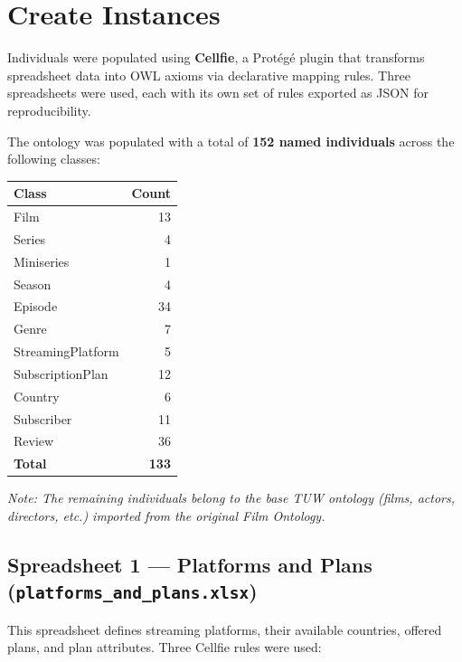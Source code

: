 \chapter{Create Instances}

Individuals were populated using \textbf{Cellfie}, a Protégé plugin that transforms spreadsheet data into OWL axioms via declarative mapping rules. Three spreadsheets were used, each with its own set of rules exported as JSON for reproducibility.

\vspace{0.3cm}
\noindent The ontology was populated with a total of \textbf{152 named individuals} across the following classes:

\begin{center}
\begin{tabular}{lr}
\hline
\textbf{Class} & \textbf{Count} \\
\hline
Film & 13 \\
Series & 4 \\
Miniseries & 1 \\
Season & 4 \\
Episode & 34 \\
Genre & 7 \\
StreamingPlatform & 5 \\
SubscriptionPlan & 12 \\
Country & 6 \\
Subscriber & 11 \\
Review & 36 \\
\hline
\textbf{Total} & \textbf{133} \\
\hline
\end{tabular}
\end{center}

\noindent\textit{Note: The remaining individuals belong to the base TUW ontology (films, actors, directors, etc.) imported from the original Film Ontology.}

\vspace{0.5cm}
\section*{Spreadsheet 1 — Platforms and Plans (\texttt{platforms\_and\_plans.xlsx})}

This spreadsheet defines streaming platforms, their available countries, offered plans, and plan attributes. Three Cellfie rules were used:

